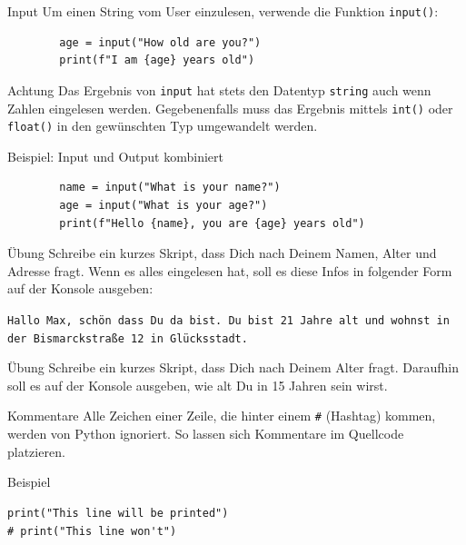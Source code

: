 \documentclass[algorithm,pgfplots,colortheme=dark]{cuzbeamer}
\newcommand{\py}[1]{\texttt{#1}}
\begin{document}
\begin{fragile}
	\begin{block}{Input}
		\vspace{2pt}
		Um einen String vom User einzulesen, verwende die Funktion \py{input()}:
		
		\begin{verbatim}
		age = input("How old are you?")
		print(f"I am {age} years old")
		\end{verbatim}
	\end{block}
	\pause 
	\begin{alertblock}{Achtung}
		\vspace{2pt}
		Das Ergebnis von \py{input} hat stets den Datentyp \py{string} auch wenn Zahlen eingelesen werden. Gegebenenfalls muss das Ergebnis mittels \py{int()} oder \py{float()} in den gewünschten Typ umgewandelt werden. 	
	\end{alertblock}
	
\end{fragile}


\begin{fragile}[]
	\begin{exampleblock}{Beispiel: Input und Output kombiniert}
		\begin{verbatim}
		name = input("What is your name?")
		age = input("What is your age?")
		print(f"Hello {name}, you are {age} years old") 
		\end{verbatim}
	\end{exampleblock}
\end{fragile}

\begin{frame}{Übung}
Schreibe ein kurzes Skript, dass Dich nach Deinem Namen, Alter und Adresse fragt. Wenn es alles eingelesen hat, soll es diese Infos in folgender Form auf der Konsole ausgeben: 	

\texttt{Hallo Max, schön dass Du da bist. Du bist 21 Jahre alt und wohnst in der Bismarckstraße 12 in Glücksstadt.}
\end{frame}


\begin{frame}{Übung}
Schreibe ein kurzes Skript, dass Dich nach Deinem Alter fragt. Daraufhin soll es auf der Konsole ausgeben, wie alt Du in 15 Jahren sein wirst. 
\end{frame}


\begin{fragile}

\begin{block}{Kommentare}
\vspace{2pt}
Alle Zeichen einer Zeile, die hinter einem \texttt{\#} (Hashtag) kommen, werden von Python ignoriert.
So lassen sich Kommentare im Quellcode platzieren. 
\end{block}
\vspace{12pt}
\begin{exampleblock}{Beispiel}
\begin{verbatim}
print("This line will be printed")
# print("This line won't") 
\end{verbatim}
\end{exampleblock}

\end{fragile}
\end{document}
